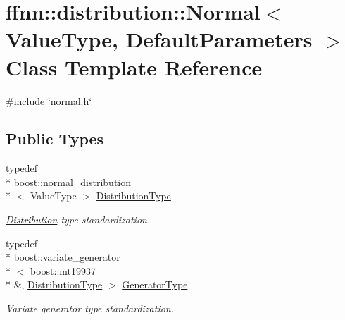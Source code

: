 \hypertarget{classffnn_1_1distribution_1_1_normal}{\section{ffnn\-:\-:distribution\-:\-:Normal$<$ Value\-Type, Default\-Parameters $>$ Class Template Reference}
\label{classffnn_1_1distribution_1_1_normal}
}


{\ttfamily \#include \char`\"{}normal.\-h\char`\"{}}

\subsection*{Public Types}
\begin{DoxyCompactItemize}
\item 
typedef \\*
boost\-::normal\-\_\-distribution\\*
$<$ Value\-Type $>$ \hyperlink{classffnn_1_1distribution_1_1_normal_a30ff73a118402782feff21954e71b3a5}{Distribution\-Type}
\begin{DoxyCompactList}\small\item\em \hyperlink{classffnn_1_1distribution_1_1_distribution}{Distribution} type standardization. \end{DoxyCompactList}\item 
typedef \\*
boost\-::variate\-\_\-generator\\*
$<$ boost\-::mt19937 \\*
\&, \hyperlink{classffnn_1_1distribution_1_1_normal_a30ff73a118402782feff21954e71b3a5}{Distribution\-Type} $>$ \hyperlink{classffnn_1_1distribution_1_1_normal_a7e672cbc0b3958c045c9518d5a0a2850}{Generator\-Type}
\begin{DoxyCompactList}\small\item\em Variate generator type standardization. \end{DoxyCompactList}\end{DoxyCompactItemize}
